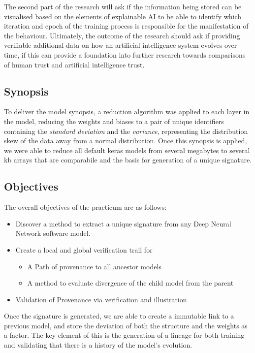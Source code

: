  The second part of the research will ask if the
information being stored can be visualised based on the elements of explainable
AI to be able to identify which iteration and epoch of the training process is
responsible for the manifestation of the behaviour. Ultimately, the outcome of
the research should ask if providing verifiable additional data on how an
artificial intelligence system evolves over time, if this can provide a
foundation into further research towards comparisons of human trust and
artificial intelligence trust.

\subsection{Synopsis}
To deliver the model synopsis, a reduction algorithm was applied to each layer in the model, reducing the weights and biases to a pair of unique identifiers containing the \textit{standard deviation} and the \textit{variance}, representing the distribution skew of the data away from a normal distribution. Once this synopsis is applied, we were able to reduce all default keras models from several megabytes to several kb arrays that are comparabile and the basis for generation of a unique signature.

\subsection{Objectives}
The overall objectives of the practicum are as follows:

\begin{itemize}
    \item Discover a method to extract a unique signature from any Deep Neural Network software model.
    \item Create a local and global verification trail for
    \begin{itemize}
        \item A Path of provenance to all ancestor models
        \item A method to evaluate divergence of the child model from the parent
    \end{itemize}
    \item Validation of Provenance via verification and illustration
\end{itemize}

Once the signature is generated, we are able to create a immutable link to a previous model, and store the deviation of both the structure and the weights as a factor. The key element of this is the generation of a lineage for both training and validating that there is a history of the model's evolution.
